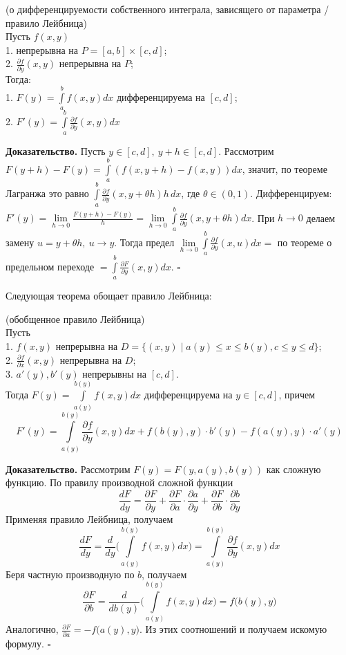 \begin{theor}
    (о дифференцируемости собственного интеграла, зависящего от параметра /
    правило Лейбница)\\
    Пусть $f(x,y)$ \\
    1. непрерывна на  $P=[a,b]\times[c,d]$;\\
    2. $\frac{\partial f}{\partial y}(x,y)$ непрерывна на $P$;\\
    Тогда:\\
    1. $F(y)=\int\limits_{a}^{b} f(x,y)dx$ дифференцируема на $[c,d]$;\\
    2. $F'(y)=\int\limits_{a}^{b}\frac{\partial f}{\partial y}(x,y)dx$
\end{theor}
\textbf{Доказательство.} Пусть $y\in[c,d],~y+h\in[c,d]$. 
Рассмотрим  $F(y+h)-F(y)=\int\limits_{a}^{b} (f(x,y+h)-f(x,y))dx$, 
значит, по теореме Лагранжа это равно $\int\limits_{a}^{b}
\frac{\partial f}{\partial y}(x,y+\theta h)h\,dx$, где $\theta\in(0,1)$. 
Дифференцируем:
$F'(y)=\lim\limits_{h \to 0}\frac{F(y+h)-F(y)}{h}=\lim\limits_{h \to 0}
\int\limits_{a}^{b} \frac{\partial f}{\partial y}(x,y+\theta h)dx$.
При $h\to 0$ делаем замену  $u=y+\theta h,~u\to y$. Тогда предел
 $\lim\limits_{h \to 0}
\int\limits_{a}^{b} \frac{\partial f}{\partial y}(x,u)dx=$
по теореме о предельном переходе $=\int\limits_{a}^{b}
\frac{\partial F}{\partial y}(x,y)dx$. $\square$ 

Следующая теорема обощает правило Лейбница:
\begin{theor} (обобщенное правило Лейбница)\\
    Пусть\\
    1. $f(x,y)$ непрерывна на $D=\{(x,y)\mid a(y)\leqslant x\leqslant 
    b(y),c\leqslant y\leqslant d\}$;\\
    2. $\frac{\partial f}{\partial x}(x,y)$ непрерывна на $D$;\\
    3. $a'(y),b'(y)$ непрерывны на  $[c,d]$.\\
    Тогда $F(y)=\int\limits_{a(y)}^{b(y)}f(x,y)dx$ дифференцируема на 
     $y\in[c,d]$, причем  
     $$F'(y)=\int\limits_{a(y)}^{b(y)}\frac{\partial f}{\partial y}(x,y)dx
     +f(b(y),y)\cdot b'(y) - f(a(y),y)\cdot a'(y)$$
\end{theor}
\textbf{Доказательство.}  Рассмотрим $F(y)=F(y,a(y),b(y))$ как сложную
функцию. По правилу производной сложной функции
$$\frac{dF}{dy}=\frac{\partial F}{\partial y}+
\frac{\partial F}{\partial a}\cdot \frac{\partial a}{\partial y} + 
\frac{\partial F}{\partial b}\cdot \frac{\partial b}{\partial y}$$
Применяя правило Лейбница, получаем
$$\frac{dF}{dy} = \frac{d}{dy}\bigg(\int\limits_{a(y)}^{b(y)}f(x,y)dx\bigg) = 
\int\limits_{a(y)}^{b(y)}\frac{\partial f}{\partial y}(x,y)dx$$
Беря частную производную по $b$, получаем
 $$\frac{\partial F}{\partial b} = 
 \frac{d}{db(y)}\bigg(\int\limits_{a(y)}^{b(y)}f(x,y)dx\bigg) = 
 f\big(b(y),y\big)$$
 Аналогично, $\frac{\partial F}{\partial a}=-f\big(a(y),y\big)$. Из этих
 соотношений и получаем искомую формулу. $\square$

